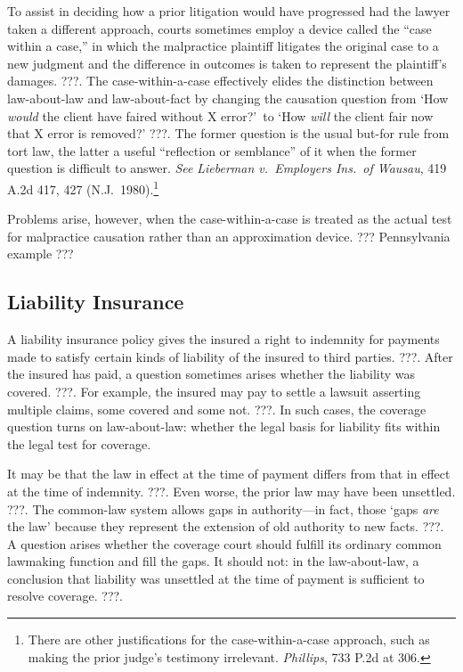 \documentclass[
  12pt,
  letterpaper,
]{scrartcl}
\begin{document}
To assist in deciding how a prior litigation would have progressed had the
lawyer taken a different approach, courts sometimes employ a device called the
``case within a case,'' in which the malpractice plaintiff litigates the
original case to a new judgment and the difference in outcomes is taken to
represent the plaintiff's damages. ???. The case-within-a-case effectively
elides the distinction between law-about-law and law-about-fact by changing the
causation question from `How \textit{would} the client have faired without X
error?'~to `How \textit{will} the client fair now that X error is removed?'
???. The former question is the usual but-for rule from tort law, the latter a
useful ``reflection or semblance'' of it when the former question is difficult
to answer. \textit{See} \textit{Lieberman v.~Employers Ins.~of Wausau}, 419
A.2d 417, 427 (N.J.~1980).\footnote{There are other justifications for the
case-within-a-case approach, such as making the prior judge's testimony
irrelevant. \textit{Phillips}, 733 P.2d at 306.}

Problems arise, however, when the case-within-a-case is treated as the actual
test for malpractice causation rather than an approximation device. ???
Pennsylvania example ???


\subsection{Liability Insurance}

A liability insurance policy gives the insured a right to indemnity for
payments made to satisfy certain kinds of liability of the insured to third
parties. ???. After the insured has paid, a question sometimes arises whether
the liability was covered. ???. For example, the insured may pay to settle a
lawsuit asserting multiple claims, some covered and some not. ???. In such
cases, the coverage question turns on law-about-law: whether the legal basis
for liability fits within the legal test for coverage.

It may be that the law in effect at the time of payment differs from that in
effect at the time of indemnity. ???. Even worse, the prior law may have been
unsettled. ???. The common-law system allows gaps in authority---in fact,
those `gaps \emph{are} the law' because they represent the extension of old
authority to new facts. ???. A question arises whether the coverage court
should fulfill its ordinary common lawmaking function and fill the gaps. It
should not: in the law-about-law, a conclusion that liability was unsettled at
the time of payment is sufficient to resolve coverage. ???.
\end{document}
